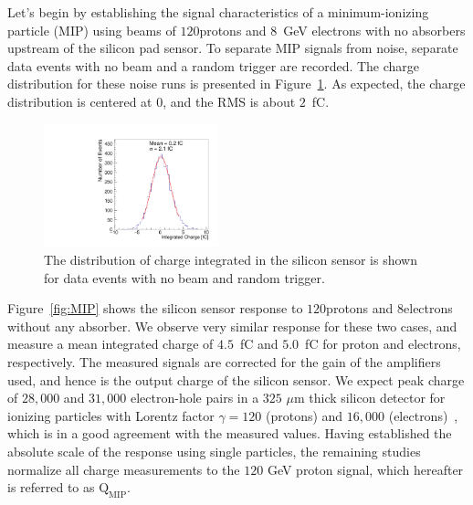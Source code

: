 Let's begin by establishing the signal characteristics of a minimum-ionizing
particle (MIP) using beams of $120$\GeV protons and $8$~GeV electrons with no
absorbers upstream of the silicon pad sensor. To separate MIP signals from
noise, separate data events with no beam and a random trigger are recorded. The charge
distribution for these noise runs is presented in Figure~\ref{fig:noise}. As expected,
the charge distribution is centered at $0$, and the RMS is about $2$~fC. 
\begin{figure}[h] 
\centering
\includegraphics[width=0.45\textwidth]{plots/NoiseNoBeam_charge.pdf} 
\caption{The distribution of charge integrated in the silicon sensor is shown for data events with no beam and random trigger. } 
\label{fig:noise} 
\end{figure} 
Figure~\ref{fig:MIP} shows the silicon sensor response to $120$\GeV protons
and $8$\GeV electrons without any absorber. We observe very similar response for
these two cases, and measure a mean integrated charge of $4.5$~fC and
$5.0$~fC for proton and electrons,
respectively. The measured signals are corrected for the gain of the amplifiers
used, and hence is the output charge of the silicon sensor. We expect peak charge
of $28,000$ and $31,000$ electron-hole pairs in a $325$ $\mu$m thick silicon
detector for ionizing particles with Lorentz factor $\gamma=120$ (protons) and $16,000$
(electrons)~\cite{Agashe:2014kda}, which is in a good agreement with the measured
values. Having established the absolute scale of the response using single
particles, the remaining studies normalize all charge measurements to the
$120$ GeV proton signal, which hereafter is referred to as
$\mathrm{Q}_{\mathrm{MIP}}$. 
